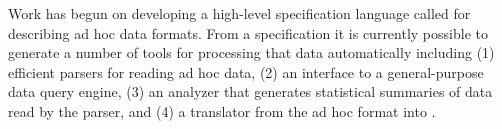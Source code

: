

Work has begun on developing a high-level specification 
language called \pads{} for describing ad hoc data formats.  From a
\pads{} specification it is currently possible to generate a number of
tools for processing that data automatically including (1)
efficient parsers for reading ad hoc data, (2) an interface to a 
general-purpose data query engine, (3) an analyzer that generates 
statistical summaries of data read by the parser, and (4)
a translator from the ad hoc format into \xml.  

